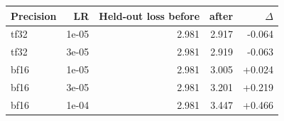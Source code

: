 \begin{tabular}{lrrrr}
\toprule
Precision & LR & Held-out loss before & after & $\Delta$ \\
\midrule
tf32 & 1e-05 & 2.981 & 2.917 & -0.064 \\
tf32 & 3e-05 & 2.981 & 2.919 & -0.063 \\
bf16 & 1e-05 & 2.981 & 3.005 & +0.024 \\
bf16 & 3e-05 & 2.981 & 3.201 & +0.219 \\
bf16 & 1e-04 & 2.981 & 3.447 & +0.466 \\
\bottomrule
\end{tabular}
